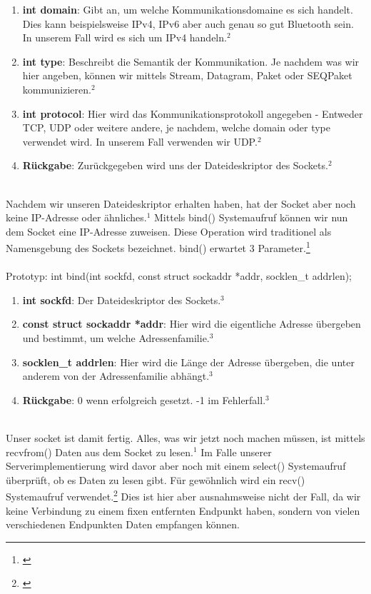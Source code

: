\begin{enumerate}
    \item \textbf{int domain}: Gibt an, um welche Kommunikationsdomaine es sich handelt. Dies kann beispielsweise IPv4, IPv6 aber auch genau so gut Bluetooth sein. In unserem Fall wird es sich um IPv4 handeln.$^{2}$
    \item \textbf{int type}: Beschreibt die Semantik der Kommunikation. Je nachdem was wir hier angeben, können wir mittels Stream, Datagram, Paket oder SEQPaket kommunizieren.$^{2}$
    \item \textbf{int protocol}: Hier wird das Kommunikationsprotokoll angegeben - Entweder TCP, UDP oder weitere andere, je nachdem, welche domain oder type verwendet wird. In unserem Fall verwenden wir UDP.$^{2}$
    \item \textbf{Rückgabe}: Zurückgegeben wird uns der Dateideskriptor des Sockets.$^{2}$
\end{enumerate} 
\ \\%
Nachdem wir unseren Dateideskriptor erhalten haben, hat der Socket aber noch keine IP-Adresse oder ähnliches.$^{1}$ Mittels bind() Systemaufruf können wir nun dem Socket eine IP-Adresse zuweisen. Diese Operation wird traditionel als Namensgebung des Sockets bezeichnet. bind() erwartet 3 Parameter.\footnote[3]{\cite[Vgl.][]{SRV16}}
\\\\
Prototyp: int bind(int sockfd, const struct sockaddr *addr, socklen\_t addrlen);
\begin{enumerate}
    \item \textbf{int sockfd}: Der Dateideskriptor des Sockets.$^{3}$
    \item \textbf{const struct sockaddr *addr}: Hier wird die eigentliche Adresse übergeben und bestimmt, um welche Adressenfamilie.$^{3}$
    \item \textbf{socklen\_t addrlen}: Hier wird die Länge der Adresse übergeben, die unter anderem von der Adressenfamilie abhängt.$^{3}$
    \item \textbf{Rückgabe}: 0 wenn erfolgreich gesetzt. -1 im Fehlerfall.$^{3}$
\end{enumerate} 
\ \\%
Unser socket ist damit fertig. Alles, was wir jetzt noch machen müssen, ist mittels recvfrom() Daten aus dem Socket zu lesen.$^{1}$ Im Falle unserer Serverimplementierung wird davor aber noch mit einem select() Systemaufruf überprüft, ob es Daten zu lesen gibt. Für gewöhnlich wird ein recv() Systemaufruf verwendet.\footnote[4]{\cite[Vgl.][]{SRV17}} Dies ist hier aber ausnahmsweise nicht der Fall, da wir keine Verbindung zu einem fixen entfernten Endpunkt haben, sondern von vielen verschiedenen Endpunkten Daten empfangen können.
